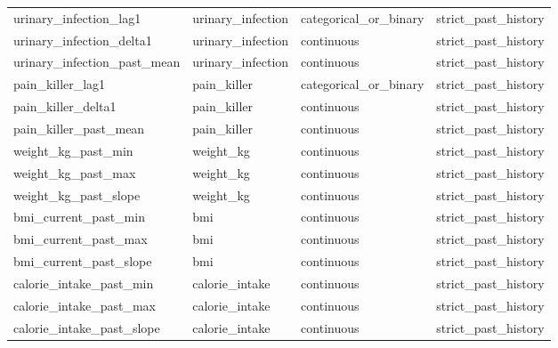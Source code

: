 \begin{longtable}{llll}
urinary\_infection\_lag1 & urinary\_infection & categorical\_or\_binary & strict\_past\_history \\
urinary\_infection\_delta1 & urinary\_infection & continuous & strict\_past\_history \\
urinary\_infection\_past\_mean & urinary\_infection & continuous & strict\_past\_history \\
pain\_killer\_lag1 & pain\_killer & categorical\_or\_binary & strict\_past\_history \\
pain\_killer\_delta1 & pain\_killer & continuous & strict\_past\_history \\
pain\_killer\_past\_mean & pain\_killer & continuous & strict\_past\_history \\
weight\_kg\_past\_min & weight\_kg & continuous & strict\_past\_history \\
weight\_kg\_past\_max & weight\_kg & continuous & strict\_past\_history \\
weight\_kg\_past\_slope & weight\_kg & continuous & strict\_past\_history \\
bmi\_current\_past\_min & bmi & continuous & strict\_past\_history \\
bmi\_current\_past\_max & bmi & continuous & strict\_past\_history \\
bmi\_current\_past\_slope & bmi & continuous & strict\_past\_history \\
calorie\_intake\_past\_min & calorie\_intake & continuous & strict\_past\_history \\
calorie\_intake\_past\_max & calorie\_intake & continuous & strict\_past\_history \\
calorie\_intake\_past\_slope & calorie\_intake & continuous & strict\_past\_history \\
\end{longtable}
